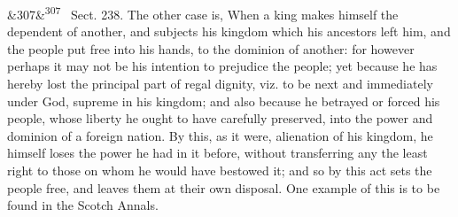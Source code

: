\documentclass[12pt]{article}
\newcommand{\para}[1][]{\par\noindent\ifx&#1&\else\textsuperscript{\footnotesize #1}~\fi}
\begin{document}
\para[307] Sect. 238. The other case is, When a king makes himself the dependent of another, and subjects his kingdom which his ancestors left him, and the people put free into his hands, to the dominion of another: for however perhaps it may not be his intention to prejudice the people; yet because he has hereby lost the principal part of regal dignity, viz. to be next and immediately under God, supreme in his kingdom; and also because he betrayed or forced his people, whose liberty he ought to have carefully preserved, into the power and dominion of a foreign nation. By this, as it were, alienation of his kingdom, he himself loses the power he had in it before, without transferring any the least right to those on whom he would have bestowed it; and so by this act sets the people free, and leaves them at their own disposal. One example of this is to be found in the Scotch Annals.
\end{document}
